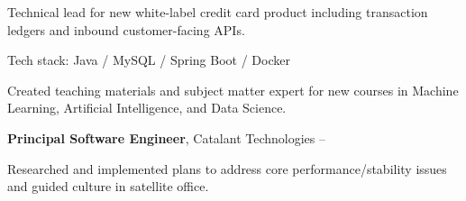 \documentclass[MMMMyyyy,nonstopmode]{simpleresumecv_stacked}
\newcommand{\tech}[1]{\Gap Tech stack: #1}
\newcommand{\techsep}{/ }
\newif\ifLOCATION
\begin{document}
\begin{Body}
\ifLOCATION
\hfill
Rochester, New York
\fi
\begin{Detail}
Technical lead for new white-label credit card product including transaction ledgers and inbound customer-facing APIs.

\tech{Java \techsep MySQL \techsep Spring Boot \techsep Docker}

\end{Detail}

\iffalse %
\BigGap

\Entry
\textbf{Consultant} - Logical Operations \textit{(Part-Time)}
\hfill
\DatestampY{2020} - \DatestampY{2022}

\ifLOCATION
\hfill 
Rochester, New York
\fi

\begin{Detail}
\BulletItem
Created teaching materials and subject matter expert for new courses in Machine Learning, Artificial Intelligence, and Data Science.
\end{Detail}
\fi %

\BigGap

\Entry
\textbf{Principal Software Engineer}, Catalant Technologies
\hfill
 -- 

\ifLOCATION
\hfill
Rochester, New York
\fi


\begin{Detail}

Researched and implemented plans to address core performance/stability issues and guided culture in satellite office.


\end{Detail}
\end{Body}
\end{document}
